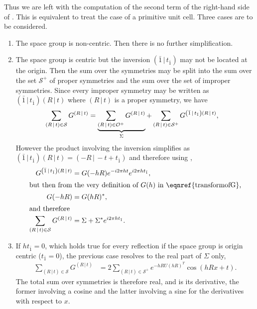 \documentclass[11pt]{article}
\newcommand{\sym}[2]{\left( #1\,\vert\, #2 \right)}
\newcommand{\inversion}{ \sym{\bar{1}}{t_{\bar{1}}} }
\begin{document}
Thus we are left with the computation of the second term of the right-hand side of . This is equivalent to treat the case of a primitive unit cell. Three cases are to be considered.
\begin{enumerate}
\item The space group is non-centric. Then there is no further simplification.
\item The space group is centric but the inversion $\inversion$ may not be located at the origin. Then the sum over the symmetries may be split into the sum over the set $\mathcal{S}^+$ of proper symmetries and the sum over the set of  improper symmetries. Since every improper symmetry may be written as $\inversion\sym{R}{t}$ where $\sym{R}{t}$ is a proper symmetry, we have
\begin{align}
\sum_{\sym{R}{t} \in \mathcal{S}} G^{\sym{R}{t}} &= 
\underbrace{\sum_{\sym{R}{t} \in \cal{O^+}} G^{\sym{R}{t}} }_{\Sigma} 
+ \sum_{\sym{R}{t} \in \mathcal{S}^+} G^{\inversion \sym{R}{t}}, \nonumber
\end{align}
However the product involving the inversion simplifies as 
$\inversion\sym{R}{t} = \sym{-R}{-t + t_{\bar{1}}}$ and therefore using ,
\begin{align}
G^{\inversion\sym{R}{t}} &= G(-hR) e^{-i2\pi ht} e^{i2\pi h t_{\bar{1}}}, \nonumber \\
 \intertext{but then from the very definition of $G(h)$ in \eqnref{transformofG},}
 G(-hR) &= G(hR)^*, \\
 \intertext{and therefore}
 \sum_{\sym{R}{t} \in \mathcal{S}} G^{\sym{R}{t}} &= \Sigma + \Sigma^* e^{i2\pi h t_{\bar{1}}}.
 \label{eqn:sumofGforcentricgroups}
\end{align}

\item If $h t_{\bar{1}}=0$, which holds true for every reflection if the space group is origin centric ($t_{\bar{1}}=0$), the previous case resolves to the real part of $\Sigma$ only,
\begin{align}
 \sum_{\sym{R}{t} \in \mathcal{S}} G^{\sym{R}{t}} & = 2 \sum_{\sym{R}{t} \in \mathcal{S}^+}  e^{-h R U (hR)^T} \cos(hRx + t).
\end{align}
The total sum over symmetries is therefore real, and is its derivative, the former involving a cosine and the latter involving a sine for the derivatives with respect to $x$. 
\end{enumerate}
\end{document}
